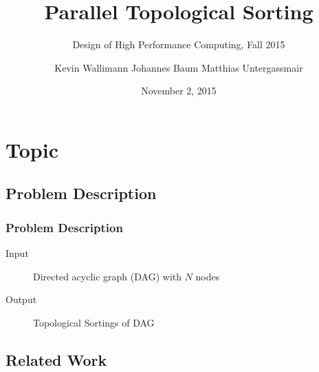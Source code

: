 

\author[]{Kevin Wallimann \quad Johannes Baum \quad Matthias Untergassmair}


\title[Topological Sorting]{Parallel Topological Sorting} %
\subtitle{Design of High Performance Computing, Fall 2015}

\date{November 2, 2015}


\begin{frame}
\titlepage %
\end{frame}


\section{Topic}

\subsection{Problem Description}

\begin{frame}
\frametitle{Problem Description}

\begin{description}
	\item[Input] Directed acyclic graph (DAG) with $N$ nodes
	\item[Output] Topological Sortings of DAG
\end{description}

\end{frame}




\subsection{Related Work}


